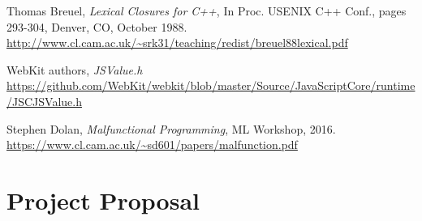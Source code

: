 \documentclass[12pt,a4paper,twoside,openright]{report}
\begin{document}
\begin{thebibliography}{1}

  Thomas Breuel,
  \emph{Lexical Closures for C++},
  In Proc. USENIX C++ Conf., pages 293-304,
  Denver, CO, October 1988.  \\ \url{http://www.cl.cam.ac.uk/~srk31/teaching/redist/breuel88lexical.pdf}

  WebKit authors,
  \emph{JSValue.h}
  \url{https://github.com/WebKit/webkit/blob/master/Source/JavaScriptCore/runtime/JSCJSValue.h}

  Stephen Dolan,
  \emph{Malfunctional Programming},
  ML Workshop, 2016.  \\ \url{https://www.cl.cam.ac.uk/~sd601/papers/malfunction.pdf}

\end{thebibliography}

\appendix

%
%
%
%
%
%
%
\chapter{Project Proposal}

%
\end{document}
